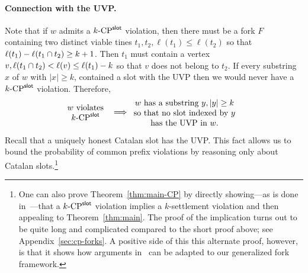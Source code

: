   \paragraph{Connection with the UVP.}
  Note that 
  if $w$ admits a ${k}\text{-}\mathrm{CP}^{\mathsf{slot}}$ violation, 
  then there must be a fork $F$ containing 
  two distinct viable tines $t_1, t_2, \ell(t_1) \leq \ell(t_2)$ 
  so that $\ell(t_1) - \ell(t_1 \cap t_2) \geq k + 1$. 
  Then $t_1$ must contain a vertex $v, \ell(t_1 \cap t_2) < \ell(v) \leq \ell(t_1) - k$ 
  so that $v$ does not belong to $t_2$. 
  If every substring $x$ of $w$ with $|x| \geq k$, contained a slot with the UVP then 
  we would never have a ${k}\text{-}\mathrm{CP}^{\mathsf{slot}}$ violation. 
  Therefore, 
  \begin{align}\label{eq:cp-uvp}
    \parbox{20mm}{\centering $w$ violates $\kSlotCP$}
    &\implies
    \parbox{45mm}{\centering
      $w$ has a substring $y, |y| \geq k$ so that 
      no slot indexed by $y$ has the UVP in $w$.
    }
  \end{align}


  Recall that a uniquely honest Catalan slot has the UVP. 
  This fact allows us to bound 
  the probability of common prefix violations by 
  reasoning only about Catalan slots.\footnote{ 
  One can also prove Theorem~\ref{thm:main-CP} 
  by 
  directly showing---as is done in~\cite{LinearConsistency}---that 
  a ${k}\text{-}\mathrm{CP}^{\mathsf{slot}}$ violation implies a $k$-settlement violation 
  and then appealing to Theorem~\ref{thm:main}. 
  The proof of the implication 
  turns out to be quite long and complicated 
  compared to the short proof above; 
  see Appendix~\ref{sec:cp-forks}.
  A positive side of this this alternate proof, however,  
  is that it shows how arguments in~\cite{LinearConsistency} 
  can be adapted to our generalized fork framework.
  }

